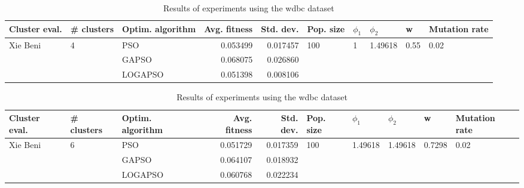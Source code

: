 \documentclass{article}
\begin{document}
\begin{table}
\centering
\caption{Results of experiments using the wdbc dataset}
\begin{tabular}{lllrrlllll}
\toprule
            Cluster eval. &        \# clusters & Optim. algorithm &  Avg. fitness &  Std. dev. &            Pop. size &         $\phi_{1}$ &               $\phi_{2}$ &                     w &         Mutation rate \\
\midrule
\multirow{3}{*}{Xie Beni} & \multirow{3}{*}{4} &              PSO &      0.053499 &   0.017457 & \multirow{3}{*}{100} & \multirow{3}{*}{1} & \multirow{3}{*}{1.49618} & \multirow{3}{*}{0.55} & \multirow{3}{*}{0.02} \\
                          &                    &            GAPSO &      0.068075 &   0.026860 &                      &                    &                          &                       &                       \\
                          &                    &          LOGAPSO &      0.051398 &   0.008106 &                      &                    &                          &                       &                       \\
\bottomrule
\end{tabular}
\end{table}
\begin{table}
\centering
\caption{Results of experiments using the wdbc dataset}
\begin{tabular}{lllrrlllll}
\toprule
            Cluster eval. &        \# clusters & Optim. algorithm &  Avg. fitness &  Std. dev. &            Pop. size &               $\phi_{1}$ &               $\phi_{2}$ &                       w &         Mutation rate \\
\midrule
\multirow{3}{*}{Xie Beni} & \multirow{3}{*}{6} &              PSO &      0.051729 &   0.017359 & \multirow{3}{*}{100} & \multirow{3}{*}{1.49618} & \multirow{3}{*}{1.49618} & \multirow{3}{*}{0.7298} & \multirow{3}{*}{0.02} \\
                          &                    &            GAPSO &      0.064107 &   0.018932 &                      &                          &                          &                         &                       \\
                          &                    &          LOGAPSO &      0.060768 &   0.022234 &                      &                          &                          &                         &                       \\
\bottomrule
\end{tabular}
\end{table}
\end{document}
